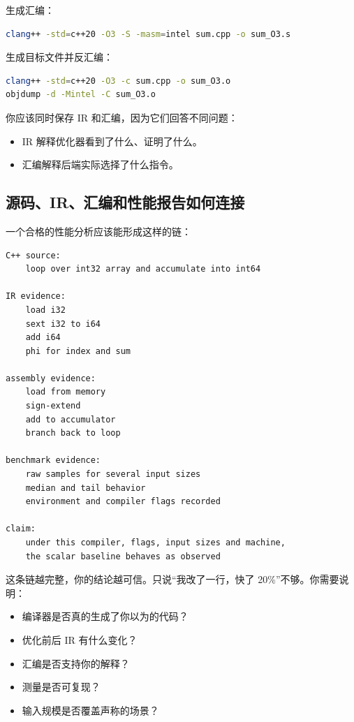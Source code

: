 生成汇编：

\begin{lstlisting}[language=bash]
clang++ -std=c++20 -O3 -S -masm=intel sum.cpp -o sum_O3.s
\end{lstlisting}

生成目标文件并反汇编：

\begin{lstlisting}[language=bash]
clang++ -std=c++20 -O3 -c sum.cpp -o sum_O3.o
objdump -d -Mintel -C sum_O3.o
\end{lstlisting}

你应该同时保存 IR 和汇编，因为它们回答不同问题：

\begin{itemize}
  \item IR 解释优化器看到了什么、证明了什么。
  \item 汇编解释后端实际选择了什么指令。
\end{itemize}

\subsection{源码、IR、汇编和性能报告如何连接}

一个合格的性能分析应该能形成这样的链：

\begin{lstlisting}
C++ source:
    loop over int32 array and accumulate into int64

IR evidence:
    load i32
    sext i32 to i64
    add i64
    phi for index and sum

assembly evidence:
    load from memory
    sign-extend
    add to accumulator
    branch back to loop

benchmark evidence:
    raw samples for several input sizes
    median and tail behavior
    environment and compiler flags recorded

claim:
    under this compiler, flags, input sizes and machine,
    the scalar baseline behaves as observed
\end{lstlisting}

这条链越完整，你的结论越可信。只说“我改了一行，快了 20\%”不够。你需要说明：

\begin{itemize}
  \item 编译器是否真的生成了你以为的代码？
  \item 优化前后 IR 有什么变化？
  \item 汇编是否支持你的解释？
  \item 测量是否可复现？
  \item 输入规模是否覆盖声称的场景？
\end{itemize}

